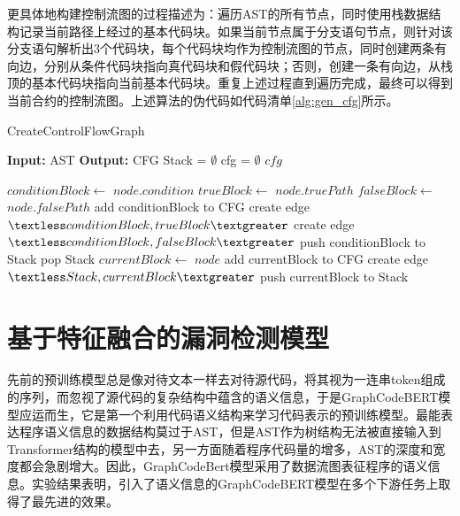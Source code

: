 更具体地构建控制流图的过程描述为：遍历AST的所有节点，同时使用栈数据结构记录当前路径上经过的基本代码块。如果当前节点属于分支语句节点，则针对该分支语句解析出3个代码块，每个代码块均作为控制流图的节点，同时创建两条有向边，分别从条件代码块指向真代码块和假代码块；否则，创建一条有向边，从栈顶的基本代码块指向当前基本代码块。重复上述过程直到遍历完成，最终可以得到当前合约的控制流图。上述算法的伪代码如代码清单\autoref{alg:gen_cfg}所示。
\begin{algorithm}
    \caption{CreateControlFlowGraph}
    \label{alg:gen_cfg}
    \begin{algorithmic}[1]
    
    
        \State \textbf{Input:} AST
        \State \textbf{Output:} CFG
        \State Stack = $\emptyset$
        \State cfg = $\emptyset$
        \State {}
        \State \Return $cfg$
    
    
            \State \Return
        \EndIf
            \State $conditionBlock \gets$ $node.condition$
            \State $trueBlock \gets$ $node.truePath$
            \State $falseBlock \gets$ $node.falsePath$
            \State add conditionBlock to CFG
            \State create edge $\textless conditionBlock, trueBlock \textgreater$
            \State create edge $\textless conditionBlock, falseBlock \textgreater$
            \State push conditionBlock to Stack
            \State {}
            \State {}
            \State pop Stack
        \Else
            \State $currentBlock \gets$ $node$
            \State add currentBlock to CFG
                \State create edge $\textless Stack, currentBlock \textgreater$
            \EndIf
            \State push currentBlock to Stack
        \EndIf
            \State {}
        \EndFor
    \EndFunction
    
    \end{algorithmic}
    \end{algorithm}
\section{基于特征融合的漏洞检测模型}
\label{sec:基于特征融合的漏洞检测模型}
先前的预训练模型总是像对待文本一样去对待源代码，将其视为一连串token组成的序列，而忽视了源代码的复杂结构中蕴含的语义信息，于是GraphCodeBERT模型应运而生，它是第一个利用代码语义结构来学习代码表示的预训练模型\cite{guo2020graphcodebert}。最能表达程序语义信息的数据结构莫过于AST，但是AST作为树结构无法被直接输入到Transformer结构的模型中去，另一方面随着程序代码量的增多，AST的深度和宽度都会急剧增大。因此，GraphCodeBert模型采用了数据流图表征程序的语义信息。实验结果表明，引入了语义信息的GraphCodeBERT模型在多个下游任务上取得了最先进的效果。

